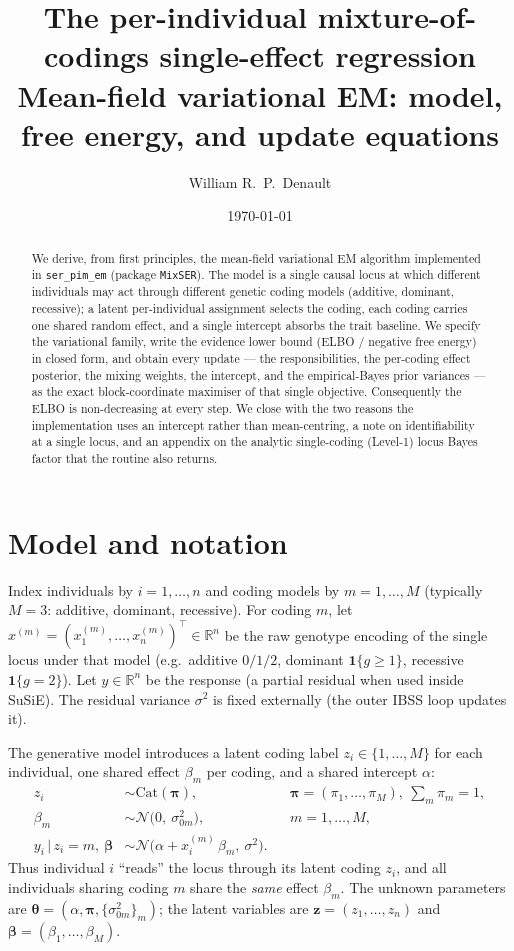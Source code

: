 \documentclass[11pt]{article}
\title{\textbf{The per-individual mixture-of-codings single-effect regression}\\[4pt]
\large Mean-field variational EM: model, free energy, and update equations}
\author{William R.\ P.\ Denault}
\date{\today}
\newcommand{\R}{\mathbb{R}}
\newcommand{\Cat}{\mathrm{Cat}}
\newcommand{\Nor}{\mathcal{N}}
\newcommand{\given}{\,\vert\,}
\newcommand{\sigsq}{\sigma^{2}}
\newcommand{\sigz}[1]{\sigma_{0#1}^{2}}
\newcommand{\xim}{x_i^{(m)}}
\theoremstyle{plain}
\theoremstyle{remark}
\begin{document}
\maketitle

\begin{abstract}
We derive, from first principles, the mean-field variational EM algorithm
implemented in \texttt{ser\_pim\_em} (package \texttt{MixSER}). The model is a
single causal locus at which different individuals may act through different
genetic coding models (additive, dominant, recessive); a latent per-individual
assignment selects the coding, each coding carries one shared random effect, and
a single intercept absorbs the trait baseline. We specify the variational family,
write the evidence lower bound (ELBO / negative free energy) in closed form, and
obtain every update --- the responsibilities, the per-coding effect posterior,
the mixing weights, the intercept, and the empirical-Bayes prior variances --- as
the exact block-coordinate maximiser of that single objective. Consequently the
ELBO is non-decreasing at every step. We close with the two reasons the
implementation uses an intercept rather than mean-centring, a note on
identifiability at a single locus, and an appendix on the analytic single-coding
(Level-1) locus Bayes factor that the routine also returns.
\end{abstract}

\section{Model and notation}\label{sec:model}

Index individuals by $i=1,\dots,n$ and coding models by $m=1,\dots,M$
(typically $M=3$: additive, dominant, recessive). For coding $m$, let
$x^{(m)}=(x_1^{(m)},\dots,x_n^{(m)})^{\!\top}\in\R^{n}$ be the raw genotype
encoding of the single locus under that model (e.g.\ additive $0/1/2$, dominant
$\mathbf 1\{g\ge 1\}$, recessive $\mathbf 1\{g=2\}$). Let $y\in\R^{n}$ be the
response (a partial residual when used inside SuSiE). The residual variance
$\sigsq$ is fixed externally (the outer IBSS loop updates it).

The generative model introduces a latent coding label $z_i\in\{1,\dots,M\}$ for
each individual, one shared effect $\beta_m$ per coding, and a shared intercept
$\alpha$:
\begin{align}
  z_i &\sim \Cat(\bm\pi), &&\bm\pi=(\pi_1,\dots,\pi_M),\ \textstyle\sum_m\pi_m=1,
  \label{eq:gen-z}\\
  \beta_m &\sim \Nor\!\big(0,\ \sigz{m}\big), &&m=1,\dots,M,
  \label{eq:gen-beta}\\
  y_i \given z_i=m,\ \bm\beta &\sim
      \Nor\!\big(\alpha + \xim\,\beta_m,\ \sigsq\big).
  \label{eq:gen-y}
\end{align}
Thus individual $i$ ``reads'' the locus through its latent coding $z_i$, and all
individuals sharing coding $m$ share the \emph{same} effect $\beta_m$. The
unknown parameters are $\bm\theta=(\alpha,\bm\pi,\{\sigz{m}\}_{m})$; the latent
variables are $\bm z=(z_1,\dots,z_n)$ and $\bm\beta=(\beta_1,\dots,\beta_M)$.
\end{document}
